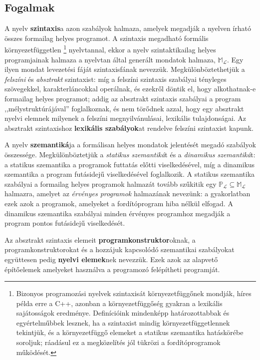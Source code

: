 \subsection{Fogalmak}
A nyelv \textbf{szintaxis}a azon szabályok halmaza, amelyek megadják a nyelven írható összes formailag helyes programot. A szintaxis megadható formális környezetfüggetlen%
\footnote{
	Bizonyos programozási nyelvek szintaxisát környezetfüggőnek mondják, híres példa erre a C++, azonban a környezetfüggőség gyakran a lexikális sajátosságok eredménye.
	Definícióink mindenképp határozottabbak és egyértelműbbek lesznek, ha a szintaxist mindig környezetfüggetlennek tekintjük, és a környezetfüggő elemeket a statikus szemantika hatáskörébe soroljuk; ráadásul ez a megközelítés jól tükrözi a fordítóprogramok működését.
}
nyelvtannal, ekkor a nyelv szintaktikailag helyes programjainak halmaza a nyelvtan által generált mondatok halmaza, $\mathbb{M}_\mathcal{L}$. Egy ilyen mondat levezetési fáját szintaxisfának nevezzük.
Megkülönböztethetjük a \textit{felszíni} és \textit{absztrakt} szintaxist: míg a felszíni szintaxis szabályai tényleges szövegekkel, karakterláncokkal operálnak, és ezekről döntik el, hogy alkothatnak-e formailag helyes programot; addig az absztrakt szintaxis szabályai a program ,,mélystruktúrájával'' foglalkoznak, és nem törődnek azzal, hogy egy absztrakt nyelvi elemnek milyenek a felszíni megnyilvánulásai, lexikális tulajdonságai.
Az absztrakt szintaxishoz \textbf{lexikális szabályok}at rendelve felszíni szintaxist kapunk.

A nyelv \textbf{szemantiká}ja a formálisan helyes mondatok jelentését megadó szabályok összessége.
Megkülönböztetjük a \textit{statikus szemantiká}t és a \textit{dinamikus szemantiká}t: a statikus szemantika a programok futtatás előtti viselkedésével, míg a dinamikus szemantika a program futásidejű viselkedésével foglalkozik.
A statikus szemantika szabályai a formailag helyes programok halmazát tovább szűkitik egy $\mathbb{P}_\mathcal{L} \subseteq \mathbb{M}_\mathcal{L}$ halmazra, amelyet az \textit{érvényes programok} halmazának nevezünk: a gyakorlatban ezek azok a programok, amelyeket a fordítóprogram hiba nélkül elfogad.
A dinamikus szemantika szabályai minden érvényes programhoz megadják a program pontos futásidejű viselkedését.

Az absztrakt szintaxis elemeit \textbf{programkonstruktor}oknak, a programkonstruktorokat és a hozzájuk kapcsolódó szemantikai szabályokat együttesen pedig \textbf{nyelvi elemek}nek nevezzük.
Ezek azok az alapvető építőelemek amelyeket használva a programozó felépítheti programját.

